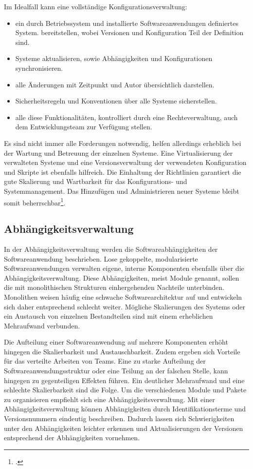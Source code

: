 Im Idealfall kann eine vollständige Konfigurationsverwaltung:
\begin{itemize}
\item ein durch Betriebssystem und installierte Softwareanwendungen definiertes System. bereitstellen, wobei Versionen und Konfiguration Teil der Definition sind.
\item Systeme aktualisieren, sowie Abhängigkeiten und Konfigurationen synchronisieren.
\item alle Änderungen mit Zeitpunkt und Autor übersichtlich darstellen.
\item Sicherheitsregeln und Konventionen über alle Systeme sicherstellen.
\item alle diese Funktionalitäten, kontrolliert durch eine Rechteverwaltung, auch dem Entwicklungsteam zur Verfügung stellen.
\end{itemize}

Es sind nicht immer alle Forderungen notwendig, helfen allerdings erheblich bei der Wartung und Betreuung der einzelnen Systeme. 
Eine Virtualisierung der verwalteten Systeme und eine Versionsverwaltung der verwendeten Konfiguration und Skripte ist ebenfalls
hilfreich. Die Einhaltung der Richtlinien garantiert die gute Skalierung und Wartbarkeit für das Konfigurations- und Systemmanagement. Das Hinzufügen und Administrieren neuer Systeme bleibt somit beherrschbar\footcite[vgl.][]{humble2010}.

\subsection{Abhängigkeitsverwaltung}
\label{subsec:dependency-management}

In der Abhängigkeitsverwaltung werden die Softwareabhängigkeiten der Softwareanwendung beschrieben. 
Lose gekoppelte, modularisierte Softwareanwendungen verwalten eigene, interne Komponenten ebenfalls über die Abhängigkeitsverwaltung. Diese Abhängigkeiten, meist Module genannt, sollen die mit monolithischen Strukturen einhergehenden Nachteile unterbinden. Monolithen weisen häufig eine 
schwache Softwarearchitektur auf und entwickeln sich daher entsprechend schlecht weiter. Mögliche Skalierungen des 
Systems oder ein Austausch von einzelnen Bestandteilen sind mit einem erheblichen Mehraufwand verbunden.

Die Aufteilung einer Softwareanwendung auf mehrere Komponenten erhöht hingegen die Skalierbarkeit und Austauschbarkeit. Zudem
ergeben sich Vorteile für das verteilte Arbeiten von Teams. 
Eine zu starke Aufteilung der Softwareanwendungsstruktur oder eine Teilung an der falschen Stelle, kann hingegen zu gegenteiligen
Effekten führen. Ein deutlicher Mehraufwand und eine schlechte Skalierbarkeit sind die Folge. Um die verschiedenen Module 
und Pakete zu organisieren empfiehlt sich eine Abhängigkeitsverwaltung. Mit einer Abhängigkeitsverwaltung können Abhängigkeiten durch Identifikationsterme und Versionsnummern eindeutig beschreiben. Dadurch lassen sich Schwierigkeiten unter den Abhängigkeiten leichter erkennen und Aktualisierungen der Versionen entsprechend der Abhängigkeiten vornehmen.

